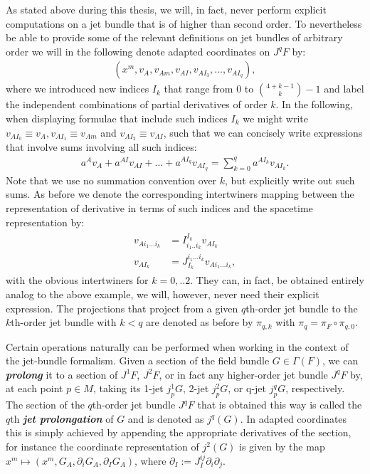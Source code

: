 \begin{remark}
As stated above during this thesis, we will, in fact, never perform explicit computations on a jet bundle that is of higher than second order. To nevertheless be able to provide some of the relevant definitions on jet bundles of arbitrary order we will in the following denote adapted coordinates on $J^qF$ by: 
\begin{align}
(x^m,v_A,v_{Am},v_{AI},v_{AI_{3}},...,v_{AI_{q}}),
\end{align}
where we introduced new indices $I_k$ that range from $0$ to $\binom{4+k-1}{k}-1$ and label the independent combinations of partial derivatives of order $k$. In the following, when displaying formulae that include such indices $I_k$ we might write $v_{AI_0} \equiv v_A, v_{AI_1} \equiv v_{Am}$ and $v_{AI_2} \equiv v_{AI}$, such that we can concisely write expressions that involve sums involving all such indices:
\begin{align}
   a^Av_A + a^{AI}v_{AI} + ... + a^{AI_q}v_{AI_q} = \sum _{k = 0}^q a^{AI_k}v_{AI_k}.
\end{align}
Note that we use no summation convention over $k$, but explicitly write out such sums.
As before we denote the corresponding intertwiners mapping between the representation of derivative in terms of such indices and the spacetime representation by:
\begin{align}
    \begin{aligned}
    v_{Ai_1...i_k} &= I^{I_k}_{i_1..i_k} v_{AI_k}\\
    v_{AI_k} &= J_{I_k}^{i_1...i_k} v_{Ai_1...i_k},
    \end{aligned}
\end{align}
with the obvious intertwiners for $k=0,..2$.
They can, in fact, be obtained entirely analog to the above example, we will, however, never need their explicit expression. 
The projections that project from a given $q$th-order jet bundle to the $k$th-order jet bundle with $k< q$ are denoted as before by $\pi_{q,k}$ with $\pi_q = \pi_F \circ \pi_{q,0}$.
\end{remark}

Certain operations naturally can be performed when working in the context of the jet-bundle formalism.
Given a section of the field bundle $G \in \Gamma(F)$, we can \textit{\textbf{prolong}} it to a section of $J^1F$, $J^2F$, or in fact any higher-order jet bundle $J^qF$ by, at each point $p \in M$, taking its 1-jet $j^1_pG$, 2-jet $j^2_pG$, or q-jet $j^q_pG$, respectively. The section of the $q$th-order jet bundle $J^qF$ that is obtained this way is called the $q$th \textbf{\textit{jet prolongation}} of $G$ and is denoted as $j^q(G)$. In adapted coordinates this is simply achieved by appending the appropriate derivatives of the section, for instance the coordinate representation of $j^2(G)$ is given by the map $x^m \mapsto (x^m, G_A, \partial_i G_A, \partial_I G_A)$, where $\partial_I := J_I^{ij} \partial_i \partial_j$.


